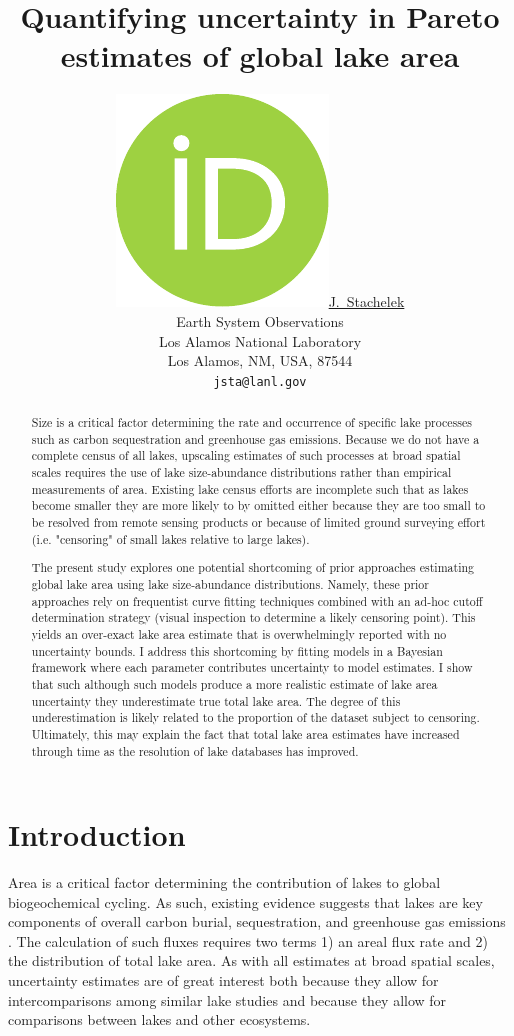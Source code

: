 \documentclass{article}
\title{Quantifying uncertainty in Pareto estimates of global lake area}
\date{} 					%
\author{ \href{https://orcid.org/0000-0002-5924-2464}{\includegraphics[scale=0.06]{orcid.pdf}\hspace{1mm}J.~Stachelek} \\
	Earth System Observations\\
	Los Alamos National Laboratory\\
	Los Alamos, NM, USA, 87544 \\
	\texttt{jsta@lanl.gov} \\
}
\begin{document}
\maketitle

\begin{abstract}
	Size is a critical factor determining the rate and occurrence of specific lake processes such as carbon sequestration and greenhouse gas emissions. Because we do not have a complete census of all lakes, upscaling estimates of such processes at broad spatial scales requires the use of lake size-abundance distributions rather than empirical measurements of area. Existing lake census efforts are incomplete such that as lakes become smaller they are more likely to by omitted either because they are too small to be resolved from remote sensing products or because of limited ground surveying effort (i.e. "censoring" of small lakes relative to large lakes).

	The present study explores one potential shortcoming of prior approaches estimating global lake area using lake size-abundance distributions. Namely, these prior approaches rely on frequentist curve fitting techniques combined with an ad-hoc cutoff determination strategy (visual inspection to determine a likely censoring point). This yields an over-exact lake area estimate that is overwhelmingly reported with no uncertainty bounds. I address this shortcoming by fitting models in a Bayesian framework where each parameter contributes uncertainty to model estimates. I show that such although such models produce a more realistic estimate of lake area uncertainty they underestimate true total lake area. The degree of this underestimation is likely related to the proportion of the dataset subject to censoring. Ultimately, this may explain the fact that total lake area estimates have increased through time as the resolution of lake databases has improved.
\end{abstract}

\section{Introduction}
Area is a critical factor determining the contribution of lakes to global biogeochemical cycling. As such, existing evidence suggests that lakes are key components of overall carbon burial, sequestration, and greenhouse gas emissions \citep{delsontroGreenhouseGasEmissions2018, kellerGlobalCarbonBudget2021}. The calculation of such fluxes requires two terms 1) an areal flux rate and 2) the distribution of total lake area. As with all estimates at broad spatial scales, uncertainty estimates are of great interest both because they allow for intercomparisons among similar lake studies and because they allow for comparisons between lakes and other ecosystems.
\end{document}
